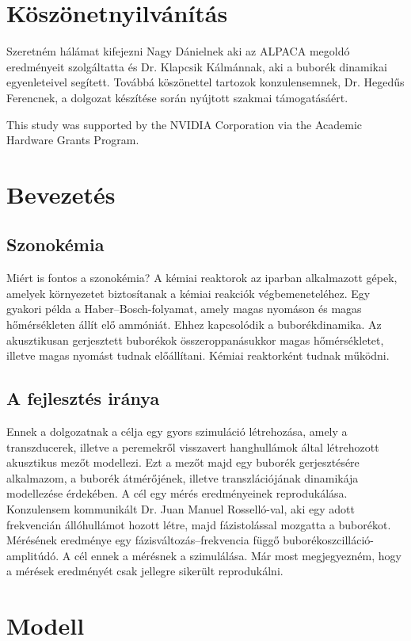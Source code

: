 \documentclass[12pt]{article}
\numberwithin{equation}{section}
\begin{document}
\section*{Köszönetnyilvánítás}

Szeretném hálámat kifejezni Nagy Dánielnek aki az ALPACA megoldó eredményeit szolgáltatta és Dr. Klapcsik Kálmánnak, aki a buborék dinamikai egyenleteivel segített.
Továbbá köszönettel tartozok konzulensemnek, Dr. Heged\H us Ferencnek, a dolgozat készítése során nyújtott szakmai támogatásáért.

This study was supported by the NVIDIA Corporation via the Academic Hardware Grants Program.


\newpage          

\setcounter{tocdepth}{4}
\tableofcontents
\newpage          


\section{Bevezetés}
\subsection{Szonokémia}
Miért is fontos a szonokémia?
A kémiai reaktorok az iparban alkalmazott gépek, amelyek környezetet biztosítanak a kémiai reakciók végbemeneteléhez.
Egy gyakori példa a Haber–Bosch-folyamat, amely magas nyomáson és magas hőmérsékleten állít elő ammóniát.
Ehhez kapcsolódik a buborékdinamika. Az akusztikusan gerjesztett buborékok összeroppanásukkor magas hőmérsékletet, illetve magas nyomást tudnak előállítani. Kémiai reaktorként tudnak működni.
\subsection{A fejlesztés iránya}
Ennek a dolgozatnak a célja egy gyors szimuláció létrehozása, amely a transzducerek, illetve a peremekről visszavert hanghullámok által létrehozott akusztikus mezőt modellezi. Ezt a mezőt majd egy buborék gerjesztésére alkalmazom, a buborék átmérőjének, illetve transzlációjának dinamikája modellezése érdekében. A cél egy mérés eredményeinek reprodukálása. Konzulensem kommunikált Dr. Juan Manuel Rosselló-val, aki egy adott frekvencián állóhullámot hozott létre, majd fázistolással mozgatta a buborékot. Mérésének eredménye egy fázisváltozás–frekvencia függő buborékoszcilláció-amplitúdó. A cél ennek a mérésnek a szimulálása. Már most megjegyezném, hogy a mérések eredményét csak jellegre sikerült reprodukálni.
\section{Modell}
\end{document}
